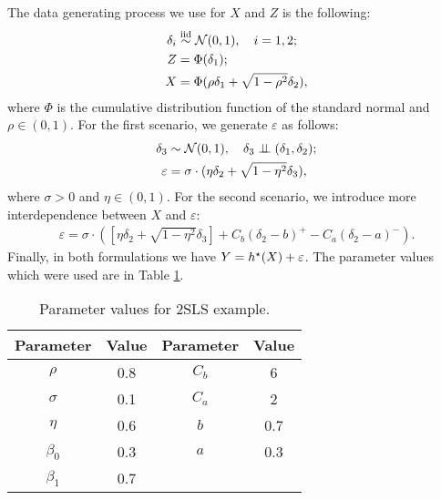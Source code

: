 The data generating process we use for $ X $ and $ Z $ is the following:
\begin{align*}
    \delta_{ i } &\overset{\mathrm{iid}}{\sim} \mathcal{N} ( 0, 1 ), \quad i = 1, 2; \\
    Z &= \Phi ( \delta_{ 1 } ); \\
    X &= \Phi ( \rho \delta_{ 1 } + \sqrt{ 1 - \rho^2 } \delta_{ 2 } )
,\end{align*}
where $ \Phi $ is the cumulative distribution function of the standard normal and $ \rho \in ( 0, 1 ) $.
For the first scenario, we generate $ \varepsilon $ as follows:
\begin{align*}
    \delta_{ 3 } &\sim \mathcal{N} ( 0, 1 ), \quad \delta_{ 3 } \perp\mkern-9.5mu\perp ( \delta_{ 1 }, \delta_{ 2 } ); \\
    \varepsilon &= \sigma \cdot ( \eta \delta_{ 2 } + \sqrt{ 1 - \eta^2 } \delta_{ 3 } )
,\end{align*}
where $ \sigma > 0 $ and $ \eta \in ( 0, 1 ) $.
For the second scenario, we introduce more interdependence between $ X $ and $ \varepsilon $:
\begin{align*}
    \varepsilon = \sigma \cdot \left(
        \left[ \eta \delta_{ 2 } + \sqrt{ 1 - \eta^2 } \delta_{ 3 } \right]
        + C_{ b } ( \delta_{ 2 } - b )^{ + } - C_{ a } ( \delta_{ 2 } - a )^{ - }
    \right)
.\end{align*}
Finally, in both formulations we have $ Y = h^{ \star } ( X ) + \varepsilon $.
The parameter values which were used are in Table \ref{parameters tsls}.
\begin{table}[htb]
    \begin{center}
        \begin{tabular}{|cccc|}
            \hline
            Parameter & Value & Parameter & Value \\
            \hline
             $ \rho $   & 0.8 &       $ C_{ b } $ & 6  \\
                                       \hline
             $ \sigma $ & 0.1 &       $ C_{ a } $ & 2   \\
                                       \hline
             $ \eta $ & 0.6 &         $ b $       & 0.7 \\
                                       \hline
             $ \beta_{ 0 } $ & 0.3  & $ a $       & 0.3  \\
             \hline
             $ \beta_{ 1 } $ & 0.7 &              &     \\
            \hline
        \end{tabular}
        \caption{Parameter values for 2SLS example.}
        \label{parameters tsls}
    \end{center}
\end{table}

